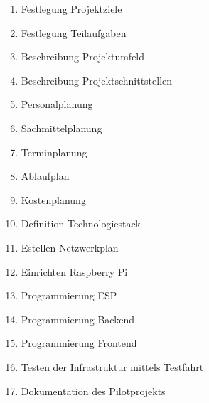\begin{enumerate}
	\item Festlegung Projektziele
	\item Festlegung Teilaufgaben
	\item Beschreibung Projektumfeld
	\item Beschreibung Projektschnittstellen
	\item Personalplanung
	\item Sachmittelplanung
	\item Terminplanung
	\item Ablaufplan
	\item Kostenplanung
	\item Definition Technologiestack
	\item Estellen Netzwerkplan
	\item Einrichten Raspberry Pi
	\item Programmierung ESP
	\item Programmierung Backend
	\item Programmierung Frontend
	\item Testen der Infrastruktur mittels Testfahrt
	\item Dokumentation des Pilotprojekts
\end{enumerate}